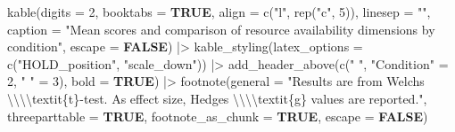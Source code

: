\documentclass[
  bookmarksnumbered]{article}
\newenvironment{Shaded}{\begin{snugshade}}{\end{snugshade}}
\newcommand{\AttributeTok}[1]{\textcolor[rgb]{0.80,0.80,0.80}{#1}}
\newcommand{\ConstantTok}[1]{\textcolor[rgb]{0.86,0.64,0.64}{\textbf{#1}}}
\newcommand{\DecValTok}[1]{\textcolor[rgb]{0.86,0.86,0.80}{#1}}
\newcommand{\FunctionTok}[1]{\textcolor[rgb]{0.94,0.94,0.56}{#1}}
\newcommand{\NormalTok}[1]{\textcolor[rgb]{0.80,0.80,0.80}{#1}}
\newcommand{\OtherTok}[1]{\textcolor[rgb]{0.94,0.94,0.56}{#1}}
\newcommand{\SpecialCharTok}[1]{\textcolor[rgb]{0.86,0.64,0.64}{#1}}
\newcommand{\StringTok}[1]{\textcolor[rgb]{0.80,0.58,0.58}{#1}}
\begin{document}
\begin{Shaded}
\begin{Highlighting}[]
  \FunctionTok{kable}\NormalTok{(}\AttributeTok{digits =} \DecValTok{2}\NormalTok{,}
        \AttributeTok{booktabs =} \ConstantTok{TRUE}\NormalTok{,}
        \AttributeTok{align =} \FunctionTok{c}\NormalTok{(}\StringTok{"l"}\NormalTok{, }\FunctionTok{rep}\NormalTok{(}\StringTok{"c"}\NormalTok{, }\DecValTok{5}\NormalTok{)),}
        \AttributeTok{linesep =} \StringTok{""}\NormalTok{,}
        \AttributeTok{caption =} \StringTok{"Mean scores and comparison of resource availability dimensions by condition"}\NormalTok{,}
        \AttributeTok{escape =} \ConstantTok{FALSE}\NormalTok{) }\SpecialCharTok{|\textgreater{}}
  \FunctionTok{kable\_styling}\NormalTok{(}\AttributeTok{latex\_options =} \FunctionTok{c}\NormalTok{(}\StringTok{"HOLD\_position"}\NormalTok{, }\StringTok{"scale\_down"}\NormalTok{)) }\SpecialCharTok{|\textgreater{}}
  \FunctionTok{add\_header\_above}\NormalTok{(}\FunctionTok{c}\NormalTok{(}\StringTok{" "}\NormalTok{,}
                     \StringTok{"Condition"} \OtherTok{=} \DecValTok{2}\NormalTok{,}
                     \StringTok{" "} \OtherTok{=} \DecValTok{3}\NormalTok{),}
                   \AttributeTok{bold =} \ConstantTok{TRUE}\NormalTok{) }\SpecialCharTok{|\textgreater{}} 
  \FunctionTok{footnote}\NormalTok{(}\AttributeTok{general =} \StringTok{"Results are from Welch\textquotesingle{}s }\SpecialCharTok{\textbackslash{}\textbackslash{}\textbackslash{}\textbackslash{}}\StringTok{textit\{t\}{-}test. }
\StringTok{           As effect size, Hedges\textquotesingle{} }\SpecialCharTok{\textbackslash{}\textbackslash{}\textbackslash{}\textbackslash{}}\StringTok{textit\{g\} values are reported."}\NormalTok{,}
           \AttributeTok{threeparttable =} \ConstantTok{TRUE}\NormalTok{,}
           \AttributeTok{footnote\_as\_chunk =} \ConstantTok{TRUE}\NormalTok{,}
           \AttributeTok{escape =} \ConstantTok{FALSE}\NormalTok{)}
\end{Highlighting}
\end{Shaded}
\end{document}
